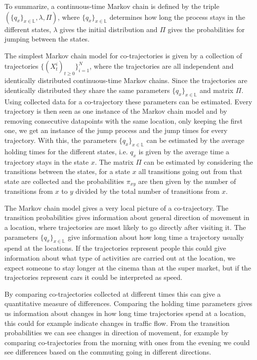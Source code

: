 \documentclass[12pt]{article}
\newcommand{\locset}{\mathbb{L}}
\theoremstyle{definition}
\begin{document}
To summarize, a continuous-time Markov chain is defined by the triple
\((\{q_{x}\}_{x \in \locset}, \lambda, \Pi)\), where
\(\{q_{x}\}_{x \in \locset}\) determines how long the process stays in
the different states, \(\lambda\) gives the initial distribution and
\(\Pi\) gives the probabilities for jumping between the states.

The simplest Markov chain model for co-trajectories is given by a
collection of trajectories \(\{(X_{t}^{i})_{t \geq 0}\}_{i = 1}^{N}\),
where the trajectories are all independent and identically distributed
continuous-time Markov chains. Since the trajectories are identically
distributed they share the same parameters
\(\{q_{x}\}_{x \in \locset}\) and matrix \(\Pi\). Using collected data
for a co-trajectory these parameters can be estimated. Every
trajectory is then seen as one instance of the Markov chain model and
by removing consecutive datapoints with the same location, only
keeping the first one, we get an instance of the jump process and the
jump times for every trajectory. With this, the parameters
\(\{q_{x}\}_{x \in \locset}\) can be estimated by the average holding
times for the different states, i.e. \(q_{x}\) is given by the average
time a trajectory stays in the state \(x\). The matrix \(\Pi\) can be
estimated by considering the transitions between the states, for a
state \(x\) all transitions going out from that state are collected
and the probabilities \(\pi_{xy}\) are then given by the number of
transitions from \(x\) to \(y\) divided by the total number of
transitions from \(x\).

The Markov chain model gives a very local picture of a co-trajectory.
The transition probabilities gives information about general direction
of movement in a location, where trajectories are most likely to go
directly after visiting it. The parameters
\(\{q_{x}\}_{x \in \locset}\) give information about how long time a
trajectory usually spend at the locations. If the trajectories
represent people this could give information about what type of
activities are carried out at the location, we expect someone to stay
longer at the cinema than at the super market, but if the trajectories
represent cars it could be interpreted as speed.

By comparing co-trajectories collected at different times this can
give a quantitative measure of differences. Comparing the holding time
parameters gives us information about changes in how long time
trajectories spend at a location, this could for example indicate
changes in traffic flow. From the transition probabilities we can see
changes in direction of movement, for example by comparing
co-trajectories from the morning with ones from the evening we could
see differences based on the commuting going in different directions.
\end{document}

